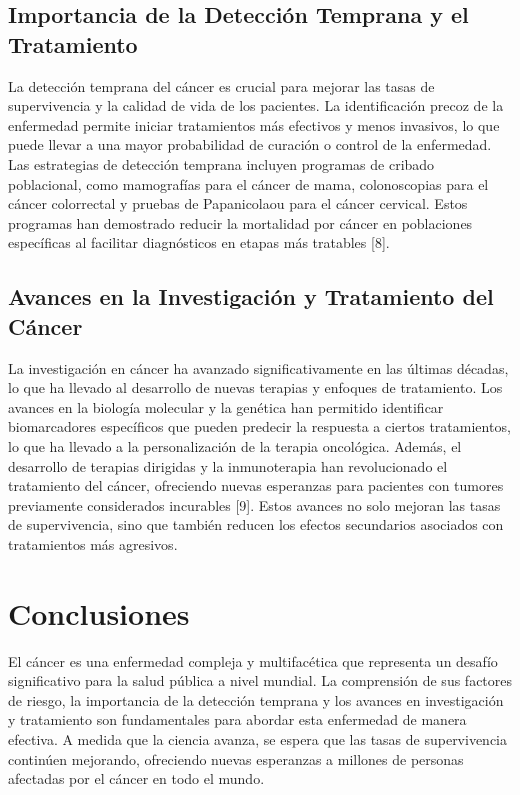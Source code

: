 \lipsum[1-2]
\subsection{Importancia de la Detección Temprana y el Tratamiento}
\label{sec:importance-early-detection}
La detección temprana del cáncer es crucial para mejorar las tasas de supervivencia y la calidad de vida de los pacientes. La identificación precoz de la enfermedad permite iniciar tratamientos más efectivos y menos invasivos, lo que puede llevar a una mayor probabilidad de curación o control de la enfermedad. Las estrategias de detección temprana incluyen programas de cribado poblacional, como mamografías para el cáncer de mama, colonoscopias para el cáncer colorrectal y pruebas de Papanicolaou para el cáncer cervical. Estos programas han demostrado reducir la mortalidad por cáncer en poblaciones específicas al facilitar diagnósticos en etapas más tratables [8].
\subsection{Avances en la Investigación y Tratamiento del Cáncer}
\label{sec:advances-cancer-research}          
La investigación en cáncer ha avanzado significativamente en las últimas décadas, lo que ha llevado al desarrollo de nuevas terapias y enfoques de tratamiento. Los avances en la biología molecular y la genética han permitido identificar biomarcadores específicos que pueden predecir la respuesta a ciertos tratamientos, lo que ha llevado a la personalización de la terapia oncológica. Además, el desarrollo de terapias dirigidas y la inmunoterapia han revolucionado el tratamiento del cáncer, ofreciendo nuevas esperanzas para pacientes con tumores previamente considerados incurables [9]. Estos avances no solo mejoran las tasas de supervivencia, sino que también reducen los efectos secundarios asociados con tratamientos más agresivos.

\section{Conclusiones}
El cáncer es una enfermedad compleja y multifacética que representa un desafío significativo para la salud pública a nivel mundial. La comprensión de sus factores de riesgo, la importancia de la detección temprana y los avances en investigación y tratamiento son fundamentales para abordar esta enfermedad de manera efectiva. A medida que la ciencia avanza, se espera que las tasas de supervivencia continúen mejorando, ofreciendo nuevas esperanzas a millones de personas afectadas por el cáncer en todo el mundo.

\lipsum[3-20]
